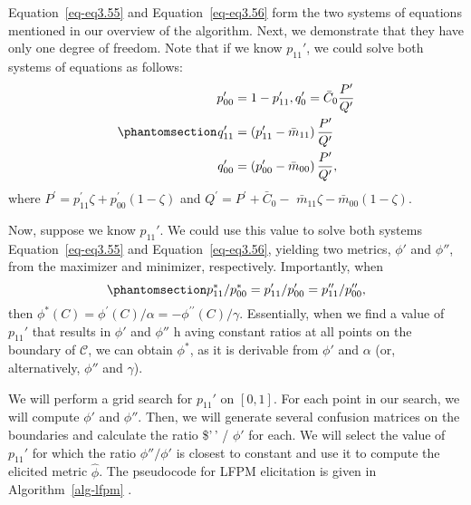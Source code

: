 \documentclass[
  letterpaper,
  numbers=noenddot,
  DIV=11]{scrreprt}
\theoremstyle{definition}
\theoremstyle{plain}
\theoremstyle{plain}
\theoremstyle{remark}
\begin{document}
Equation~\ref{eq-eq3.55} and Equation~\ref{eq-eq3.56} form the two
systems of equations mentioned in our overview of the algorithm. Next,
we demonstrate that they have only one degree of freedom. Note that if
we know \(p_{11}'\), we could solve both systems of equations as
follows:
\begin{equation}\phantomsection\label{eq-eq3.57}{\begin{aligned}
    p_{00}^{\prime}  &=1-p_{11}^{\prime}, q_{0}^{\prime}=\bar{C}_{0} \frac{P^{\prime}}{Q^{\prime}}\\
    q_{11}^{\prime}  &=\left(p_{11}^{\prime}-\bar{m}_{11}\right) \frac{P^{\prime}}{Q^{\prime}} \\
    q_{00}^{\prime}&=\left(p_{00}^{\prime}-\bar{m}_{00}\right) \frac{P^{\prime}}{Q^{\prime}},
\end{aligned}}\end{equation} where
\(P^{\prime}=p_{11}^{\prime} \zeta+p_{00}^{\prime}(1-\zeta)\) and
\(Q^{\prime}=P^{\prime}+\bar{C}_{0}-\)
\(\bar{m}_{11} \zeta-\bar{m}_{00}(1-\zeta).\)

Now, suppose we know \(p_{11}'\). We could use this value to solve both
systems Equation~\ref{eq-eq3.55} and Equation~\ref{eq-eq3.56}, yielding
two metrics, \(\phi'\) and \(\phi''\), from the maximizer and minimizer,
respectively. Importantly, when
\begin{equation}\phantomsection\label{eq-eq3.58}{p_{11}^{*} / p_{00}^{*}=p_{11}^{\prime} / p_{00}^{\prime}=p_{11}^{\prime \prime} / p_{00}^{\prime \prime},}\end{equation}
then
\(\phi^{*}(C)=\phi^{\prime}(C) / \alpha=-\phi^{\prime \prime}(C) / \gamma\).
Essentially, when we find a value of \(p_{11}'\) that results in
\(\phi'\) and \(\phi''\) h aving constant ratios at all points on the
boundary of \(\mathcal{C}\), we can obtain \(\phi^*\), as it is
derivable from \(\phi'\) and \(\alpha\) (or, alternatively, \(\phi''\)
and \(\gamma\)).

We will perform a grid search for \(p_{11}'\) on \([0,1]\). For each
point in our search, we will compute \(\phi'\) and \(\phi''\). Then, we
will generate several confusion matrices on the boundaries and calculate
the ratio \$\phi'\,' / \(\phi'\) for each. We will select the value of
\(p_{11}'\) for which the ratio \(\phi'' / \phi'\) is closest to
constant and use it to compute the elicited metric \(\hat{\phi}\). The
pseudocode for LFPM elicitation is given in  Algorithm~\ref{alg-lfpm} .
\end{document}
